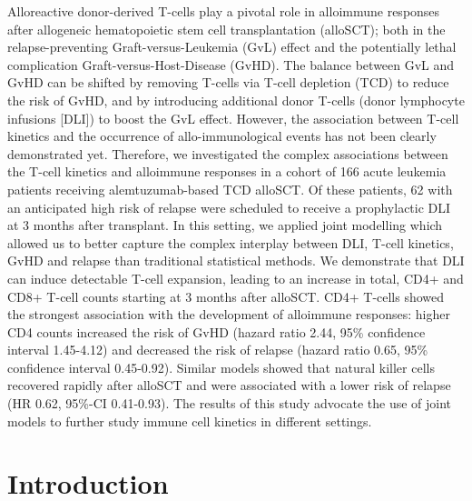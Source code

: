 \documentclass[
  letterpaper,
  paper=240mm:170mm,
  twoside=true,
  open=right,
  fontsize=10pt,
  pagesize=false,
  BCOR=15mm,
  DIV=14,
  headinclude=true,
  footinclude=false,
  headsepline=on]{scrbook}
\begin{document}
Alloreactive donor-derived T-cells play a pivotal role in alloimmune
responses after allogeneic hematopoietic stem cell transplantation
(alloSCT); both in the relapse-preventing Graft-versus-Leukemia (GvL)
effect and the potentially lethal complication Graft-versus-Host-Disease
(GvHD). The balance between GvL and GvHD can be shifted by removing
T-cells via T-cell depletion (TCD) to reduce the risk of GvHD, and by
introducing additional donor T-cells (donor lymphocyte infusions
{[}DLI{]}) to boost the GvL effect. However, the association between
T-cell kinetics and the occurrence of allo-immunological events has not
been clearly demonstrated yet. Therefore, we investigated the complex
associations between the T-cell kinetics and alloimmune responses in a
cohort of 166 acute leukemia patients receiving alemtuzumab-based TCD
alloSCT. Of these patients, 62 with an anticipated high risk of relapse
were scheduled to receive a prophylactic DLI at 3 months after
transplant. In this setting, we applied joint modelling which allowed us
to better capture the complex interplay between DLI, T-cell kinetics,
GvHD and relapse than traditional statistical methods. We demonstrate
that DLI can induce detectable T-cell expansion, leading to an increase
in total, CD4+ and CD8+ T-cell counts starting at 3 months after
alloSCT. CD4+ T-cells showed the strongest association with the
development of alloimmune responses: higher CD4 counts increased the
risk of GvHD (hazard ratio 2.44, 95\% confidence interval 1.45-4.12) and
decreased the risk of relapse (hazard ratio 0.65, 95\% confidence
interval 0.45-0.92). Similar models showed that natural killer cells
recovered rapidly after alloSCT and were associated with a lower risk of
relapse (HR 0.62, 95\%-CI 0.41-0.93). The results of this study advocate
the use of joint models to further study immune cell kinetics in
different settings.

\clearpage

\section{Introduction}\label{introduction-4}
\end{document}
